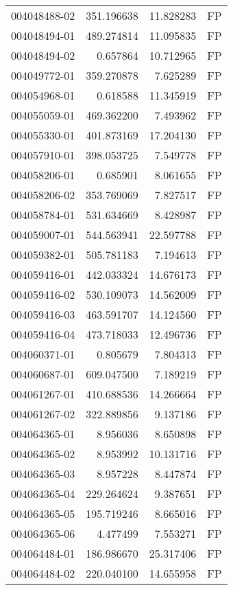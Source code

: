 \begin{tabular}{lrrl}
004048488-02 &  351.196638 &    11.828283 &   FP \\
004048494-01 &  489.274814 &    11.095835 &   FP \\
004048494-02 &    0.657864 &    10.712965 &   FP \\
004049772-01 &  359.270878 &     7.625289 &   FP \\
004054968-01 &    0.618588 &    11.345919 &   FP \\
004055059-01 &  469.362200 &     7.493962 &   FP \\
004055330-01 &  401.873169 &    17.204130 &   FP \\
004057910-01 &  398.053725 &     7.549778 &   FP \\
004058206-01 &    0.685901 &     8.061655 &   FP \\
004058206-02 &  353.769069 &     7.827517 &   FP \\
004058784-01 &  531.634669 &     8.428987 &   FP \\
004059007-01 &  544.563941 &    22.597788 &   FP \\
004059382-01 &  505.781183 &     7.194613 &   FP \\
004059416-01 &  442.033324 &    14.676173 &   FP \\
004059416-02 &  530.109073 &    14.562009 &   FP \\
004059416-03 &  463.591707 &    14.124560 &   FP \\
004059416-04 &  473.718033 &    12.496736 &   FP \\
004060371-01 &    0.805679 &     7.804313 &   FP \\
004060687-01 &  609.047500 &     7.189219 &   FP \\
004061267-01 &  410.688536 &    14.266664 &   FP \\
004061267-02 &  322.889856 &     9.137186 &   FP \\
004064365-01 &    8.956036 &     8.650898 &   FP \\
004064365-02 &    8.953992 &    10.131716 &   FP \\
004064365-03 &    8.957228 &     8.447874 &   FP \\
004064365-04 &  229.264624 &     9.387651 &   FP \\
004064365-05 &  195.719246 &     8.665016 &   FP \\
004064365-06 &    4.477499 &     7.553271 &   FP \\
004064484-01 &  186.986670 &    25.317406 &   FP \\
004064484-02 &  220.040100 &    14.655958 &   FP \\

\end{tabular}

